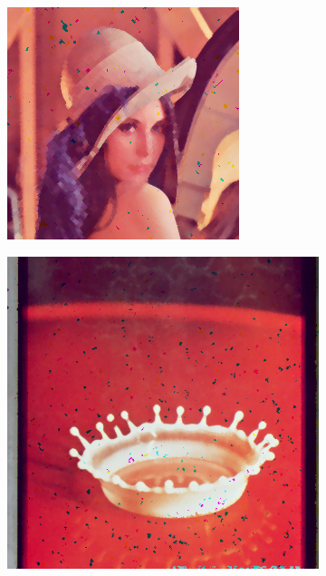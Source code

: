 \begin{subfigure}{0.9\textwidth}
   \centering
\begin{subfigure}[t]{0.15\textwidth}
    \includegraphics[width=0.9\linewidth]{../images/outputs/denoise/oc/oc0.png}
    
    \centering
  \end{subfigure}
\begin{subfigure}[t]{0.15\textwidth}
    \includegraphics[width=0.9\linewidth]{../images/outputs/denoise/oc/oc1.png}
    

\end{subfigure}
\end{subfigure}
